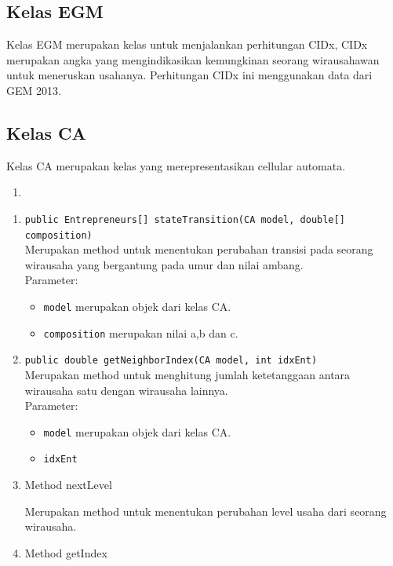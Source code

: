 \subsection{Kelas EGM}
	Kelas EGM merupakan kelas untuk menjalankan perhitungan CIDx, CIDx merupakan angka yang mengindikasikan kemungkinan seorang wirausahawan untuk meneruskan usahanya. Perhitungan CIDx ini menggunakan data dari GEM 2013.
	
\subsection{Kelas CA} 
Kelas CA merupakan kelas yang merepresentasikan cellular automata.
		\begin{enumerate}
			\item 
		\end{enumerate}
		\begin{enumerate}
			\item \texttt{public Entrepreneurs[] stateTransition(CA model, double[] composition)}\\
			Merupakan method untuk menentukan perubahan transisi pada seorang wirausaha yang bergantung pada umur dan nilai ambang.\\			Parameter:
			\begin{itemize}
				\item \texttt{model} merupakan objek dari kelas CA.
				\item \texttt{composition} merupakan nilai a,b dan c.
			\end{itemize}
			
			\item \texttt{public double getNeighborIndex(CA model, int idxEnt)}\\
			Merupakan method untuk menghitung jumlah ketetanggaan antara wirausaha satu dengan wirausaha lainnya.\\
			Parameter:
			\begin{itemize}
				\item \texttt{model} merupakan objek dari kelas CA.
				\item \texttt{idxEnt}
			\end{itemize}
			
			
			\item Method nextLevel
			
			Merupakan method untuk menentukan perubahan level usaha dari seorang wirausaha.
			
			\item Method getIndex
			

\end{enumerate}
